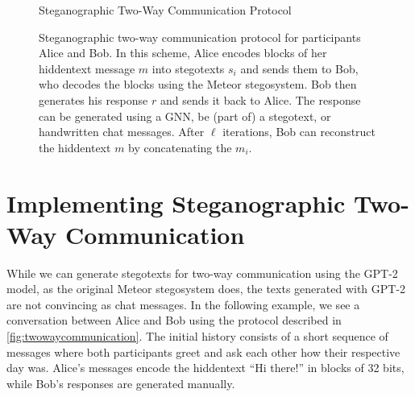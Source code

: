 \begin{figure}[htbp]
  \centering
  \begin{msc}[instance distance=4cm,action width=5cm]{Steganographic Two-Way Communication Protocol}
    \nextlevel[2]
    \nextlevel[3]
    \nextlevel[2]
    \nextlevel[3]
    \nextlevel
    \nextlevel[2]
    \nextlevel[3]
    \nextlevel
    \nextlevel[2]
    \nextlevel[3]
    \nextlevel
  \end{msc}
  \caption{
  Steganographic two-way communication protocol for participants Alice and Bob.
  In this scheme, Alice encodes blocks of her hiddentext message $m$ into stegotexts $s_i$ and sends them to Bob, who decodes the blocks using the Meteor stegosystem.
  Bob then generates his response $r$ and sends it back to Alice.
  The response can be generated using a GNN, be (part of) a stegotext, or handwritten chat messages.
  After $\ell$ iterations, Bob can reconstruct the hiddentext $m$ by concatenating the $m_i$.
  }
  \label{fig:twowaycommunication}
\end{figure}

\section{Implementing Steganographic Two-Way Communication}
While we can generate stegotexts for two-way communication using the GPT-2 model, as the original Meteor stegosystem does, the texts generated with GPT-2 are not convincing as chat messages. 
In the following example, we see a conversation between Alice and Bob using the protocol described in \autoref{fig:twowaycommunication}.
The initial history consists of a short sequence of messages where both participants greet and ask each other how their respective day was.
Alice's messages encode the hiddentext ``Hi there!'' in blocks of 32 bits, while Bob's responses are generated manually.

